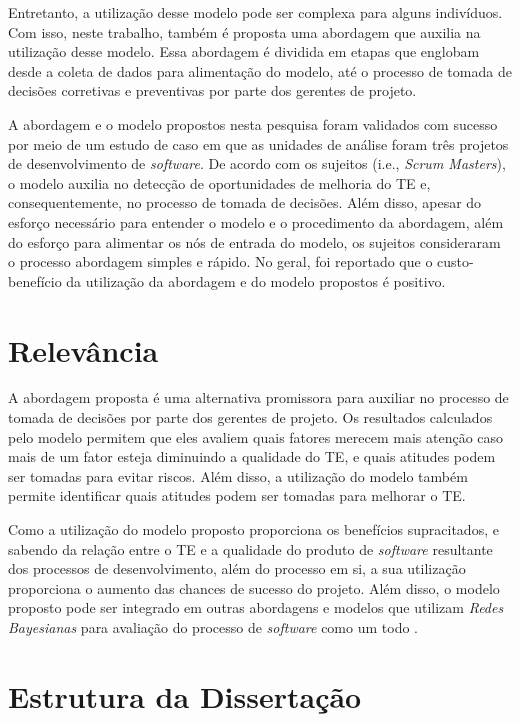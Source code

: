 Entretanto, a utilização desse modelo pode ser complexa para alguns indivíduos. Com isso, neste trabalho, também é proposta uma abordagem que auxilia na utilização desse modelo. Essa abordagem é dividida em etapas que englobam desde a coleta de dados para alimentação do modelo, até o processo de tomada de decisões corretivas e preventivas por parte dos gerentes de projeto.

A abordagem e o modelo propostos nesta pesquisa foram validados com sucesso por meio de um estudo de caso em que as unidades de análise foram três projetos de desenvolvimento de \textit{software}. De acordo com os sujeitos (i.e., \textit{Scrum Masters}), o modelo auxilia no detecção de oportunidades de melhoria do TE e, consequentemente, no processo de tomada de decisões. Além disso, apesar do esforço necessário para entender o modelo e o procedimento da abordagem, além do esforço para alimentar os nós de entrada do modelo, os sujeitos consideraram o processo abordagem simples e rápido. No geral, foi reportado que o custo-benefício da utilização da abordagem e do modelo propostos é positivo.

\section{Relevância}
\label{introducao:relevancia}

A abordagem proposta é uma alternativa promissora para auxiliar no processo de tomada de decisões por parte dos gerentes de projeto. Os resultados calculados pelo modelo permitem que eles avaliem quais fatores merecem mais atenção caso mais de um fator esteja diminuindo a qualidade do TE, e quais atitudes podem ser tomadas para evitar riscos. Além disso, a utilização do modelo também permite identificar quais atitudes podem ser tomadas para melhorar o TE.

Como a utilização do modelo proposto proporciona os benefícios supracitados, e sabendo da relação entre o TE e a qualidade do produto de \textit{software} resultante dos processos de desenvolvimento, além do processo em si, a sua utilização proporciona o aumento das chances de sucesso do projeto. Além disso, o modelo proposto pode ser integrado em outras abordagens e modelos que utilizam \textit{Redes Bayesianas} para avaliação do processo de \textit{software} como um todo \cite{perkusich2014} \cite{perkusich2013}.

\section{Estrutura da Dissertação}
\label{introducao:estrutura}

